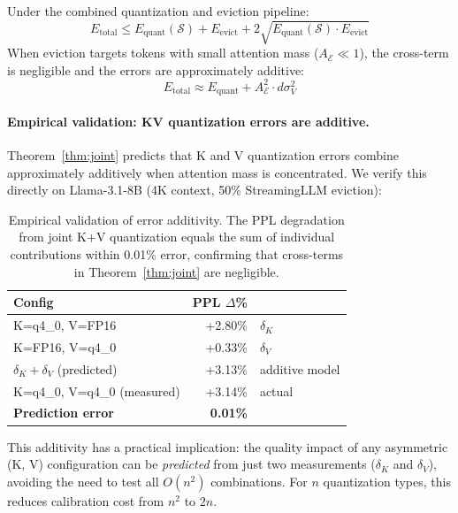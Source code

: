 \begin{theorem}
\label{thm:joint}
Under the combined quantization and eviction pipeline:
\begin{equation}
    E_{\text{total}} \leq E_{\text{quant}}(\mathcal{S}) + E_{\text{evict}} + 2\sqrt{E_{\text{quant}}(\mathcal{S}) \cdot E_{\text{evict}}}
\end{equation}
When eviction targets tokens with small attention mass ($A_{\mathcal{E}} \ll 1$), the cross-term is negligible and the errors are approximately additive:
\begin{equation}
    E_{\text{total}} \approx E_{\text{quant}} + A_{\mathcal{E}}^2 \cdot d\sigma_V^2
\end{equation}
\end{theorem}

\paragraph{Empirical validation: KV quantization errors are additive.}
Theorem~\ref{thm:joint} predicts that K and V quantization errors combine approximately additively when attention mass is concentrated. We verify this directly on Llama-3.1-8B (4K context, 50\% StreamingLLM eviction):

\begin{table}[h]
\centering
\begin{tabular}{lrl}
\toprule
\textbf{Config} & \textbf{PPL $\Delta$\%} & \\
\midrule
K=q4\_0, V=FP16 & +2.80\% & $\delta_K$ \\
K=FP16, V=q4\_0 & +0.33\% & $\delta_V$ \\
\midrule
$\delta_K + \delta_V$ (predicted) & +3.13\% & additive model \\
K=q4\_0, V=q4\_0 (measured) & +3.14\% & actual \\
\midrule
\textbf{Prediction error} & \textbf{0.01\%} & \\
\bottomrule
\end{tabular}
\caption{Empirical validation of error additivity. The PPL degradation from joint K+V quantization equals the sum of individual contributions within 0.01\% error, confirming that cross-terms in Theorem~\ref{thm:joint} are negligible.}
\label{tab:additivity}
\end{table}

\noindent This additivity has a practical implication: the quality impact of any asymmetric (K, V) configuration can be \emph{predicted} from just two measurements ($\delta_K$ and $\delta_V$), avoiding the need to test all $O(n^2)$ combinations. For $n$ quantization types, this reduces calibration cost from $n^2$ to $2n$.

